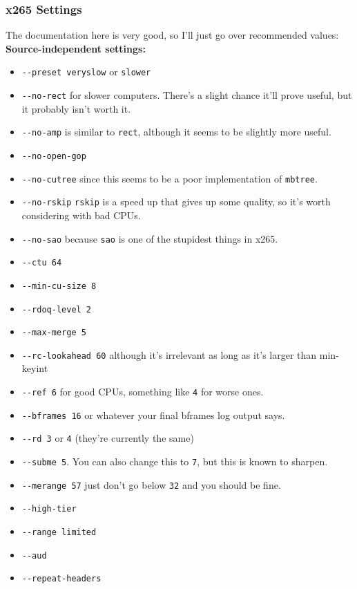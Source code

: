 \documentclass{scrartcl}
\begin{document}
\subsubsection{x265 Settings}

The documentation here is very good, so I'll just go over recommended values:\\
\textbf{Source-independent settings:}
\begin{itemize}
\item \texttt{-{}-preset veryslow} or \texttt{slower}
\item \texttt{-{}-no-rect} for slower computers.  There's a slight chance it'll prove useful, but it probably isn't worth it.
\item \texttt{-{}-no-amp} is similar to \texttt{rect}, although it seems to be slightly more useful.
\item \texttt{-{}-no-open-gop}
\item \texttt{-{}-no-cutree} since this seems to be a poor implementation of \texttt{mbtree}.
\item \texttt{-{}-no-rskip} \texttt{rskip} is a speed up that gives up some quality, so it's worth considering with bad CPUs.
\item \texttt{-{}-no-sao} because \texttt{sao} is one of the stupidest things in x265.
\item \texttt{-{}-ctu 64}
\item \texttt{-{}-min-cu-size 8}
\item \texttt{-{}-rdoq-level 2}
\item \texttt{-{}-max-merge 5}
\item \texttt{-{}-rc-lookahead 60} although it's irrelevant as long as it's larger than min-keyint
\item \texttt{-{}-ref 6} for good CPUs, something like \texttt{4} for worse ones.
\item \texttt{-{}-bframes 16} or whatever your final bframes log output says.
\item \texttt{-{}-rd 3} or \texttt{4} (they're currently the same)
\item \texttt{-{}-subme 5}.  You can also change this to \texttt{7}, but this is known to sharpen.
\item \texttt{-{}-merange 57} just don't go below \texttt{32} and you should be fine.
\item \texttt{-{}-high-tier}
\item \texttt{-{}-range limited}
\item \texttt{-{}-aud}
\item \texttt{-{}-repeat-headers}
\end{itemize}
\end{document}
